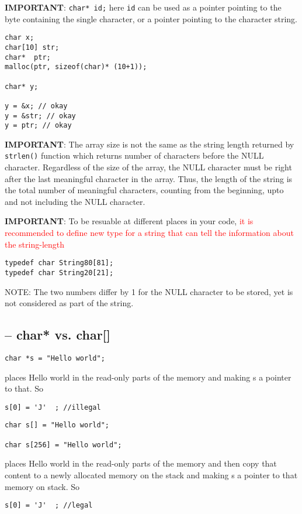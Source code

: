 

{\bf IMPORTANT}: \verb!char* id;! here \verb!id! can be used as a pointer
pointing to the byte containing the single character, or a pointer pointing to the
character string.
\begin{verbatim}
char x;
char[10] str;
char*  ptr;
malloc(ptr, sizeof(char)* (10+1));

char* y;

y = &x; // okay
y = &str; // okay
y = ptr; // okay
\end{verbatim}

{\bf IMPORTANT}: The array size is not the same as the string length returned by
\verb!strlen()! function which returns number of characters before the NULL
character. Regardless of the size of the array, the NULL character must be right
after the last meaningful character in the array. Thus, the length of the string
is the total number of meaningful characters, counting from the beginning, upto
and not including the NULL character.


{\bf IMPORTANT}: To be resuable at different places in your code,
\textcolor{red}{it is recommended to define new type for a string that can tell the information
about the string-length}
\begin{verbatim}
typedef char String80[81];
typedef char String20[21];
\end{verbatim}
NOTE: The two numbers differ by 1 for the NULL character to be stored, yet is
not considered as part of the string.


\subsection{-- char* vs. char[]}

\begin{verbatim}
char *s = "Hello world";
\end{verbatim}
places Hello world in the read-only parts of the memory and making s a pointer
to that. So
\begin{verbatim}
s[0] = 'J'  ; //illegal
\end{verbatim}

\begin{verbatim}
char s[] = "Hello world";

char s[256] = "Hello world";
\end{verbatim}
places Hello world in the read-only parts of the memory and then copy that
content to a newly allocated memory on the stack and making s a pointer to
that memory on stack. So
\begin{verbatim}
s[0] = 'J'  ; //legal
\end{verbatim}



